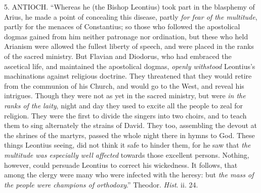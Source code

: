 5. ANTIOCH.
``Whereas he (the Bishop Leontius) took part in the blasphemy of
Arius, he made a point of concealing this disease, partly \emph{for fear of
the multitude}, partly for the menaces of Constantius; so those who
followed the apostolical dogmas gained from him neither patronage nor
ordination, but these who held Arianism were allowed the fullest liberty
of speech, and were placed in the ranks of the sacred ministry. But
Flavian and Diodorus, who had embraced the ascetical life, and
maintained the apostolical dogmas, \emph{openly withstood} Leontius's
machinations against religious doctrine. They threatened that they would
retire from the communion of his Church, and would go to the West, and
reveal his intrigues. Though they were not as yet in the sacred
ministry, but were \emph{in the ranks of the laity}, night and day they
used to excite all the people to zeal for religion. They were the first
to divide the singers into two choirs, and to teach them to sing
alternately the strains of David. They too, assembling the devout at the
shrines of the martyrs, passed the whole night there in hymns to God.
These things Leontius seeing, did not think it safe to hinder them, for
he saw that \emph{the multitude was especially well affected} towards
those excellent persons. Nothing, however, could persuade Leontius to
correct his wickedness. It follows, that among the clergy were many who
were infected with the heresy: but \emph{the mass of the people were
champions of orthodoxy}.'' Theodor. \emph{Hist}. ii. 24.

